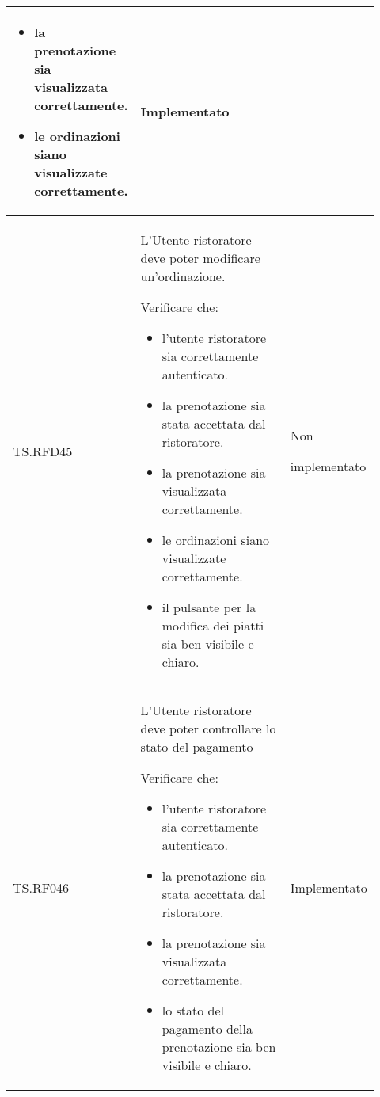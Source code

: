 \begin{longtable}{|p{0.10\linewidth}|p{0.70\linewidth}|p{0.12\linewidth}|}
\begin{itemize}
		\item la prenotazione sia visualizzata correttamente.
		\item le ordinazioni siano visualizzate correttamente.
	\end{itemize}                                                                      &
	Implementato                                                                                                                                                   \\
	\hline
	TS.RFD45                                                                                                                        &
	L'Utente ristoratore deve poter modificare un'ordinazione. \par
	Verificare che:
	\begin{itemize}
		\item l'utente ristoratore sia correttamente autenticato.
		\item la prenotazione sia stata accettata dal ristoratore.
		\item la prenotazione sia visualizzata correttamente.
		\item le ordinazioni siano visualizzate correttamente.
		\item il pulsante per la modifica dei piatti sia ben visibile e chiaro.
	\end{itemize}                                                         &
	Non \par implementato                                                                                                                                                   \\
	\hline
	TS.RF046                                                                                                                        &
	L'Utente ristoratore deve poter controllare lo stato del pagamento  \par
	Verificare che:
	\begin{itemize}
		\item l'utente ristoratore sia correttamente autenticato.
		\item la prenotazione sia stata accettata dal ristoratore.
		\item la prenotazione sia visualizzata correttamente.
		\item lo stato del pagamento della prenotazione sia ben visibile e chiaro.
	\end{itemize}                                                      &
	Implementato                                                                                                                                                   \\

\end{longtable}
